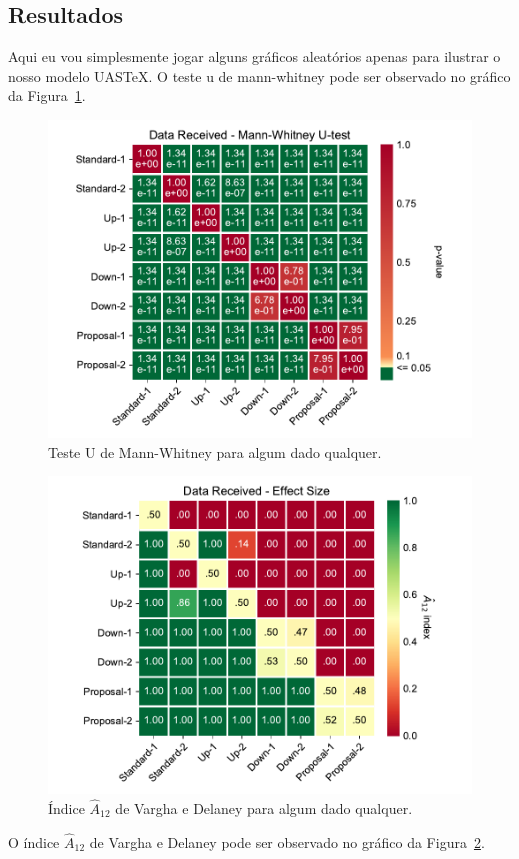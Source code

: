 \documentclass[portuguese,noindentfirst]{UASTeX} %
\begin{document}
\lipsum[1-1]

\subsection{Resultados}\label{sec:results}

Aqui eu vou simplesmente jogar alguns gráficos aleatórios apenas para ilustrar o nosso modelo UAS\TeX. O teste u de mann-whitney pode ser observado no gráfico da Figura~\ref{fig:mw}.

\begin{figure}[ht]
	\centering
	\includegraphics[width=.6\textwidth]{images/charts/mw}
	\caption{Teste U de Mann-Whitney para algum dado qualquer.}
	\label{fig:mw}
\end{figure}

\lipsum[1-1]

\begin{figure}[ht]
	\centering
	\includegraphics[width=.6\textwidth]{images/charts/vd}
	\caption{Índice $\hat{A}_{12}$ de Vargha e Delaney para algum dado qualquer.}
	\label{fig:vd}
\end{figure}

O índice $\hat{A}_{12}$ de Vargha e Delaney pode ser observado no gráfico da Figura~\ref{fig:vd}.
\lipsum[1-1]
\end{document}
